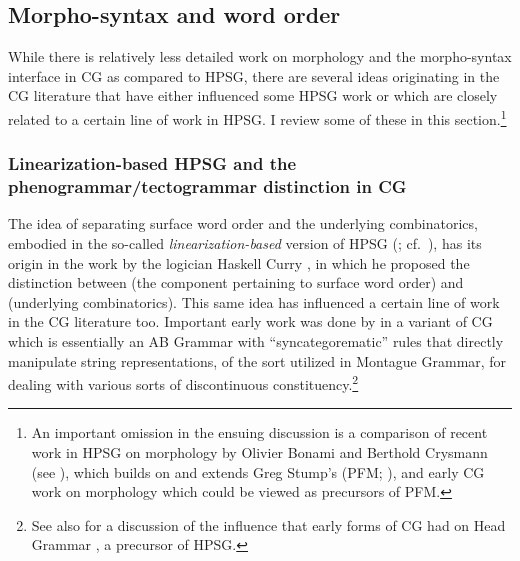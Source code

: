 \documentclass[output=paper,biblatex,babelshorthands,newtxmath,draftmode,colorlinks,citecolor=brown]{langscibook}
\begin{document}
\subsection{Morpho-syntax and word order \label{sec:morphology}}

\largerpage\enlargethispage{3pt}
While there is relatively less detailed work on morphology and the
morpho-syntax interface in CG as compared to HPSG, there are several
ideas originating in the CG literature that have either
influenced some HPSG work or which are closely related to a certain
line of work in HPSG. I review some of these in this
section.\footnote{An important omission in the ensuing discussion is a
comparison of recent work in HPSG on morphology by Olivier Bonami and
Berthold Crysmann (see ), which builds on
and extends Greg Stump's  (PFM;
\citealt{Stump2001a}), and early CG work on morphology
\citep{hoeksema-diss,moortgat84,hoeksemajanda88,raffelsiefen92} which
could be viewed as precursors of PFM.}



\subsubsection{Linearization-based HPSG and the phenogrammar/tectogrammar distinction in CG }

The idea of separating surface word order and the underlying
combinatorics, embodied in the so-called \emph{linearization-based}
version of HPSG (\citealt{Reape94a,Mueller95c,Kathol2000a};
cf.\ ), has its origin 
in the work by the logician Haskell Curry \citeyearpar{curry61}, in which he
proposed the distinction between  (the component
pertaining to surface word order) and  (underlying
combinatorics). This same idea has influenced a certain line of work
in the CG literature too. Important early work was done by
\citeauthor{Dowty82a-u} \citeyearpar{Dowty82a-u,Dowty90a-Eng} in a variant of CG which is essentially an
AB Grammar with ``syncategorematic'' rules that directly manipulate
string representations, of the sort utilized in Montague Grammar, for
dealing with various sorts of discontinuous constituency.\footnote{See
also  for a discussion of the influence
that early forms of CG \citep{Bach79a,Bach80a,Dowty82a-u,Dowty82b} had
on Head Grammar \citep{Pollard84a-u}, a precursor of HPSG.}
\end{document}
